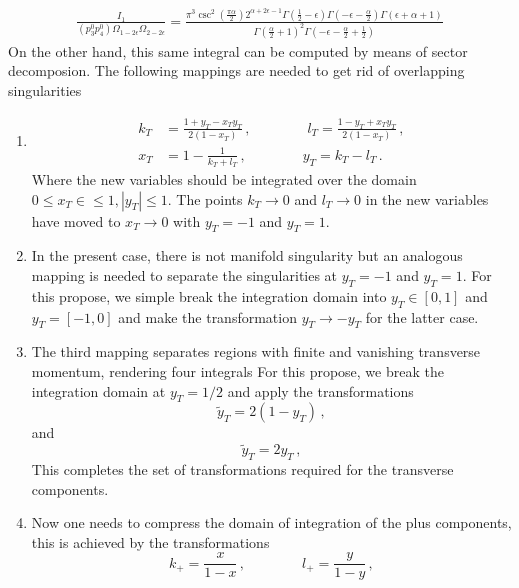 \documentclass[a4paper,11pt]{article}
\numberwithin{equation}{section}
\newcommand{\kp}{k_+}
\newcommand{\lp}{l_+}
\begin{document}
\begin{align}
\frac {I_1}{ (p_3^0 p_4^0)  \Omega_{1-2\epsilon} \Omega_{2-2\epsilon} }=
\frac{\pi ^3 \csc ^2\left(\frac{\pi  \alpha }{2}\right) 2^{\alpha +2 \epsilon-1} \Gamma \left(\frac{1}{2}-\epsilon\right) \Gamma \left(-\epsilon-\frac{\alpha }{2}\right) \Gamma (\epsilon+\alpha +1)}{\Gamma \left(\frac{\alpha }{2}+1\right)^2 \Gamma \left(-\epsilon-\frac{\alpha }{2}+\frac{1}{2}\right)} 
\label{eq:analytic}
\end{align}
On the other hand, this same integral can be computed by means of sector decomposion. The following mappings 
are needed to get rid of overlapping singularities
\begin{enumerate}
\item 
\begin{align}
  k_T &= \frac{1+y_T-x_T y_T}{2(1-x_T)}\,,
  \qquad \qquad
  l_T = \frac{1-y_T+x_T y_T}{2(1-x_T)}\,, \\
  x_T &= 1-\frac{1}{k_T+l_T}\,,
  \qquad \qquad
  y_T = k_T-l_T\,.
\end{align}
Where the new variables should be integrated over the domain $0\le x_T\in \le 1, |y_T|\le 1$. 
The points $k_T\to 0$ and $l_T\to 0$ in the new variables have moved to $x_T\to 0$ with 
$y_T=-1$ and $y_T=1$. 
\item In the present case, there is not manifold singularity but an analogous mapping is needed to separate the singularities at   $y_T=-1$ and $y_T=1$. For this propose, we simple break the integration domain into 
$y_T\in [0,1]$ and $y_T= [-1,0]$ and make the transformation $y_T \to -y_T$ for the latter case. 
\item The third mapping separates regions with finite and vanishing transverse momentum, rendering four integrals
For this propose, we break the integration domain at $y_T=1/2$ and apply the transformations
%
\begin{equation}
  \tilde y_T = 2(1- y_T)\,,
\end{equation}
%
and
%
\begin{equation}
  \tilde y_T = 2  y_T\,,
\end{equation}
%
This completes the set of transformations required for the transverse components. 
\item Now one needs to compress the domain of integration of the plus components, this is achieved by 
the transformations
%
\begin{equation}
  \kp = \frac{x}{1-x}\,, 
  \qquad \qquad
  \lp = \frac{y}{1-y}\,, 
\end{equation}

\end{enumerate}
\end{document}
